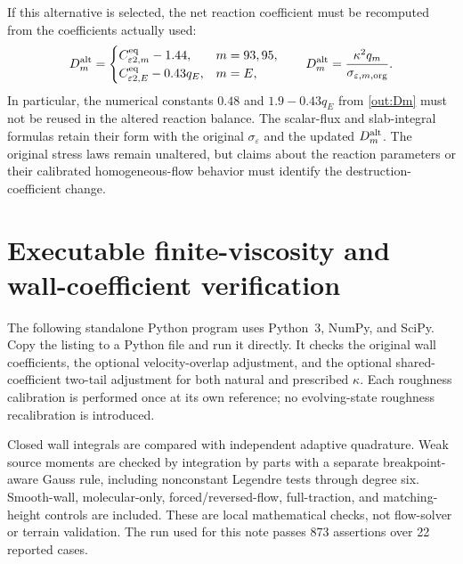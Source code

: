 \documentclass[11pt,a4paper]{article}
\numberwithin{equation}{section}
\newcommand{\eps}{\varepsilon}
\begin{document}
If this alternative is selected, the net reaction coefficient must be
recomputed from the coefficients actually used:
\begin{equation}
 D_m^{\rm alt}=
 \begin{cases}
 C_{\eps2,m}^{\rm eq}-1.44,&m=93,95,\\
 C_{\eps2,E}^{\rm eq}-0.43q_E,&m=E,
 \end{cases}
 \qquad
 D_m^{\rm alt}=\frac{\kappa^2q_m}{\sigma_{\eps,m,\rm org}}.
 \label{out:Dalternative}
\end{equation}
In particular, the numerical constants $0.48$ and
$1.9-0.43q_E$ from \cref{out:Dm} must not be reused in the altered
reaction balance. The scalar-flux and slab-integral formulas retain
their form with the original $\sigma_\eps$ and the updated
$D_m^{\rm alt}$. The original stress laws remain unaltered, but claims
about the reaction parameters or their calibrated homogeneous-flow
behavior must identify the destruction-coefficient change.

\section{Executable finite-viscosity and wall-coefficient verification}
\label{app:wall-verification}

The following standalone Python program uses Python~3, NumPy, and
SciPy. Copy the listing to a Python file and run it directly. It
checks the original wall coefficients, the optional velocity-overlap
adjustment, and the optional shared-coefficient two-tail adjustment
for both natural and prescribed $\kappa$. Each roughness calibration
is performed once at its own reference; no evolving-state roughness
recalibration is introduced.

Closed wall integrals are compared with independent adaptive
quadrature. Weak source moments are checked by integration by parts
with a separate breakpoint-aware Gauss rule, including nonconstant
Legendre tests through degree six. Smooth-wall, molecular-only,
forced/reversed-flow, full-traction, and matching-height controls
are included. These are local mathematical checks, not flow-solver
or terrain validation. The run used for this note passes 873
assertions over 22 reported cases.
\end{document}
